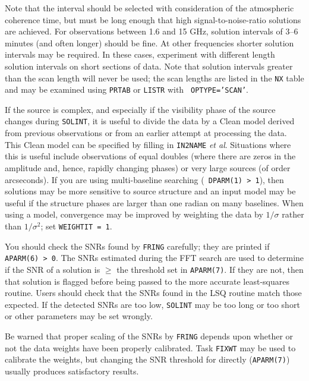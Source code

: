 Note that the {\tt {}} interval should be selected with
consideration of the atmospheric coherence time, but must be long
enough that high signal-to-noise-ratio solutions are achieved.
For observations between 1.6 and 15 GHz, solution intervals of 3--6
minutes (and often longer) should be fine.  At other frequencies
shorter solution intervals may be required.  In these cases,
experiment with different length solution intervals on short sections
of data.  Note that solution intervals greater than the scan length
will never be used; the scan lengths are listed in the {\tt NX} table
and may be examined using {\tt PRTAB} or {\tt LISTR} with {\tt
OPTYPE='SCAN'}\@.

If the source is complex, and especially if the visibility phase of
the source changes during {\tt SOLINT}, it is useful to divide the
data by a Clean model derived from previous observations or from an
earlier attempt at processing the data.  This Clean model can be
specified by filling in {\tt IN2NAME} {\it et al}.  Situations where
this is useful include observations of equal doubles (where there are
zeros in the amplitude and, hence, rapidly changing phases) or very
large sources (of order arcseconds).  If you are using multi-baseline
searching (\ie\ {\tt DPARM(1) > 1}), then solutions may be more
sensitive to source structure and an input model may be useful if the
structure phases are larger than one radian on many baselines.  When
using a model, convergence may be improved by weighting the data by
$1/\sigma$ rather than $1/\sigma^2$; set {\tt WEIGHTIT = 1}\@.

You should check the SNRs found by {\tt FRING} carefully; they are
printed if {\tt APARM(6) > 0}.  The SNRs estimated during the FFT
search are used to determine if the SNR of a solution is $\ge$ the
threshold set in {\tt APARM(7)}\@.  If they are not, then that
solution is flagged before being passed to the more accurate
least-squares routine.  Users should check that the SNRs found in the
LSQ routine match those expected.  If the detected SNRs are too low,
{\tt SOLINT} may be too long or too short or other parameters may be
set wrongly.

Be warned that proper scaling of the SNRs by {\tt FRING} depends upon
whether or not the data weights have been properly calibrated.  Task
{\tt FIXWT} may be used to calibrate the weights, but changing the SNR
threshold for {\tt {}} directly ({\tt APARM(7)}) usually
produces satisfactory results.


